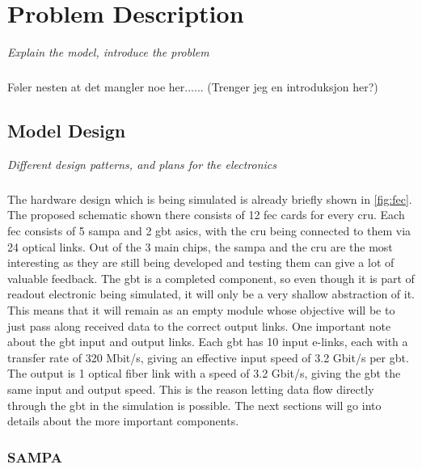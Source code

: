 \documentclass[a4paper, 12pt]{report}
\begin{document}
\chapter{Problem Description}
\textit{Explain the model, introduce the problem}

\paragraph{}
Føler nesten at det mangler noe her...... (Trenger jeg en introduksjon her?)

\section{Model Design}
\textit{Different design patterns, and plans for the electronics}
\paragraph{}
The hardware design which is being simulated is already briefly shown in \ref{fig:fec}.
The proposed schematic shown there consists of 12 \gls{fec} cards for every \gls{cru}.
Each \gls{fec} consists of 5 \gls{sampa} and 2 \gls{gbt} \glspl{asic}, with the \gls{cru} being connected to them via 24 optical links.
Out of the 3 main chips, the \gls{sampa} and the \gls{cru} are the most interesting as they are still being developed and testing them can give a lot of valuable feedback.
The \gls{gbt} is a completed component, so even though it is part of readout electronic being simulated, it will only be a very shallow abstraction of it.
This means that it will remain as an empty module whose objective will be to just pass along received data to the correct output links.
One important note about the \gls{gbt} input and output links.
Each \gls{gbt} has 10 input e-links, each with a transfer rate of 320 Mbit/s, giving an effective input speed of 3.2 Gbit/s per \gls{gbt}.
The output is 1 optical fiber link with a speed of 3.2 Gbit/s, giving the \gls{gbt} the same input and output speed.
This is the reason letting data flow directly through the \gls{gbt} in the simulation is possible.
The next sections will go into details about the more important components.

\subsection{SAMPA}
\label{subsec:sampa}
\end{document}
